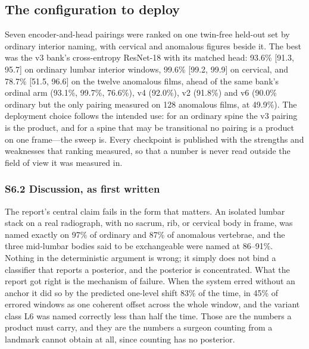 \documentclass[11pt,letterpaper]{article}
\newcommand{\ci}[2]{[#1, #2]}
\begin{document}
\subsection*{The configuration to deploy}
Seven encoder-and-head pairings were ranked on one twin-free held-out set by ordinary interior naming, with cervical and anomalous figures beside it. The best was the v3 bank's cross-entropy ResNet-18 with its matched head: 93.6\% \ci{91.3}{95.7} on ordinary lumbar interior windows, 99.6\% \ci{99.2}{99.9} on cervical, and 78.7\% \ci{51.5}{96.6} on the twelve anomalous films, ahead of the same bank's ordinal arm (93.1\%, 99.7\%, 76.6\%), v4 (92.0\%), v2 (91.8\%) and v6 (90.0\% ordinary but the only pairing measured on 128 anomalous films, at 49.9\%). The deployment choice follows the intended use: for an ordinary spine the v3 pairing is the product, and for a spine that may be transitional no pairing is a product on one frame---the sweep is. Every checkpoint is published with the strengths and weaknesses that ranking measured, so that a number is never read outside the field of view it was measured in.


\subsubsection*{S6.2 Discussion, as first written}
The report's central claim fails in the form that matters. An isolated lumbar stack on a real radiograph, with no sacrum, rib, or cervical body in frame, was named exactly on 97\% of ordinary and 87\% of anomalous vertebrae, and the three mid-lumbar bodies said to be exchangeable were named at 86--91\%. Nothing in the deterministic argument is wrong; it simply does not bind a classifier that reports a posterior, and the posterior is concentrated. What the report got right is the mechanism of failure. When the system erred without an anchor it did so by the predicted one-level shift 83\% of the time, in 45\% of errored windows as one coherent offset across the whole window, and the variant class L6 was named correctly less than half the time. Those are the numbers a product must carry, and they are the numbers a surgeon counting from a landmark cannot obtain at all, since counting has no posterior.
\end{document}
